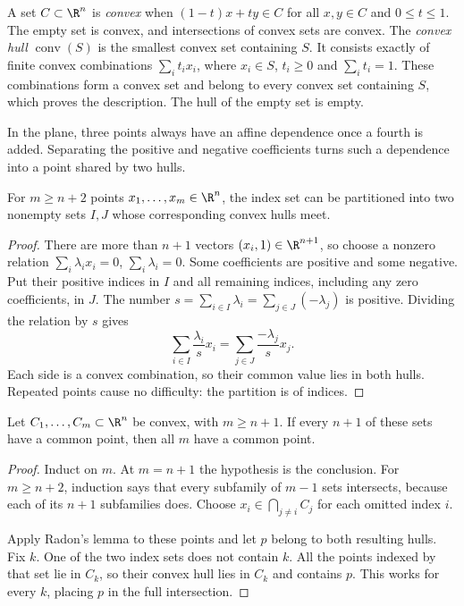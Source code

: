 A set $C\subset\R^n$ is \emph{convex} when $(1-t)x+ty\in C$ for all $x,y\in C$ and $0\le t\le1$. The empty set is convex, and intersections of convex sets are convex. The \emph{convex hull} $\operatorname{conv}(S)$ is the smallest convex set containing $S$. It consists exactly of finite convex combinations $\sum_i t_ix_i$, where $x_i\in S$, $t_i\ge0$ and $\sum_i t_i=1$. These combinations form a convex set and belong to every convex set containing $S$, which proves the description. The hull of the empty set is empty.

In the plane, three points always have an affine dependence once a fourth is added. Separating the positive and negative coefficients turns such a dependence into a point shared by two hulls.

\begin{lemma}[Radon, 1921]\label{geometry:lem:radon}
For $m\ge n+2$ points $x_1,\ldots,x_m\in\R^n$, the index set can be partitioned into two nonempty sets $I,J$ whose corresponding convex hulls meet.
\end{lemma}

\begin{proof}
There are more than $n+1$ vectors $(x_i,1)\in\R^{n+1}$, so choose a nonzero relation
$\sum_i\lambda_ix_i=0$, $\sum_i\lambda_i=0$. Some coefficients are positive and some negative. Put their positive indices in $I$ and all remaining indices, including any zero coefficients, in $J$. The number
$s=\sum_{i\in I}\lambda_i=\sum_{j\in J}(-\lambda_j)$ is positive. Dividing the relation by $s$ gives
\[
\sum_{i\in I}\frac{\lambda_i}{s}x_i
=\sum_{j\in J}\frac{-\lambda_j}{s}x_j.
\]
Each side is a convex combination, so their common value lies in both hulls. Repeated points cause no difficulty: the partition is of indices.
\end{proof}

\begin{theorem}[Helly]\label{geometry:thm:helly}
Let $C_1,\ldots,C_m\subset\R^n$ be convex, with $m\ge n+1$. If every $n+1$ of these sets have a common point, then all $m$ have a common point.
\end{theorem}

\begin{proof}
Induct on $m$. At $m=n+1$ the hypothesis is the conclusion. For $m\ge n+2$, induction says that every subfamily of $m-1$ sets intersects, because each of its $n+1$ subfamilies does. Choose $x_i\in\bigcap_{j\ne i}C_j$ for each omitted index $i$.

Apply Radon's lemma to these points and let $p$ belong to both resulting hulls. Fix $k$. One of the two index sets does not contain $k$. All the points indexed by that set lie in $C_k$, so their convex hull lies in $C_k$ and contains $p$. This works for every $k$, placing $p$ in the full intersection.
\end{proof}

